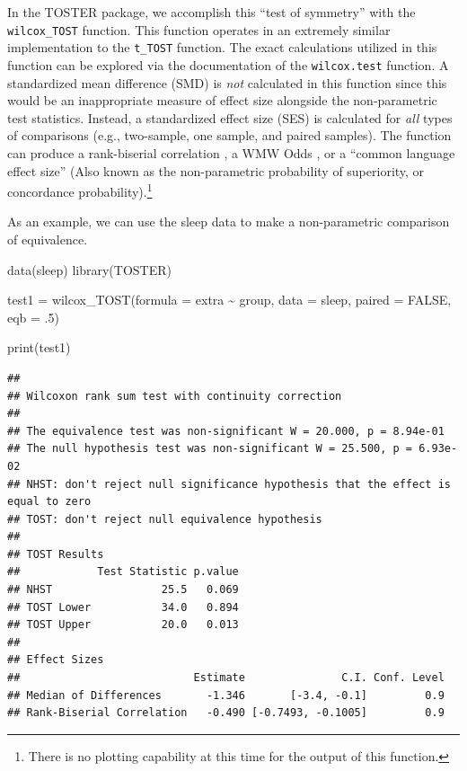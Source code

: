 \documentclass[]{interact}
\theoremstyle{plain}%
\theoremstyle{definition}
\theoremstyle{remark}
\newenvironment{Shaded}{\begin{snugshade}}{\end{snugshade}}
\newcommand{\AttributeTok}[1]{\textcolor[rgb]{0.77,0.63,0.00}{#1}}
\newcommand{\ConstantTok}[1]{\textcolor[rgb]{0.00,0.00,0.00}{#1}}
\newcommand{\DecValTok}[1]{\textcolor[rgb]{0.00,0.00,0.81}{#1}}
\newcommand{\FunctionTok}[1]{\textcolor[rgb]{0.00,0.00,0.00}{#1}}
\newcommand{\NormalTok}[1]{#1}
\newcommand{\OtherTok}[1]{\textcolor[rgb]{0.56,0.35,0.01}{#1}}
\newcommand{\SpecialCharTok}[1]{\textcolor[rgb]{0.00,0.00,0.00}{#1}}
\newcommand{\StringTok}[1]{\textcolor[rgb]{0.31,0.60,0.02}{#1}}
\begin{document}
In the TOSTER package, we accomplish this ``test of symmetry'' with the
\texttt{wilcox\_TOST} function. This function operates in an extremely
similar implementation to the \texttt{t\_TOST} function. The exact
calculations utilized in this function can be explored via the
documentation of the \texttt{wilcox.test} function. A standardized mean
difference (SMD) is \emph{not} calculated in this function since this
would be an inappropriate measure of effect size alongside the
non-parametric test statistics. Instead, a standardized effect size
(SES) is calculated for \emph{all} types of comparisons (e.g.,
two-sample, one sample, and paired samples). The function can produce a
rank-biserial correlation \citep{Kerby_2014}, a WMW Odds
\citep{wmwodds}, or a ``common language effect size'' \citep{Kerby_2014}
(Also known as the non-parametric probability of superiority, or
concordance probability).\footnote{There is no plotting capability at
  this time for the output of this function.}

As an example, we can use the sleep data to make a non-parametric
comparison of equivalence.

\begin{Shaded}
\begin{Highlighting}[]
\FunctionTok{data}\NormalTok{(}\StringTok{\textquotesingle{}sleep\textquotesingle{}}\NormalTok{)}
\FunctionTok{library}\NormalTok{(TOSTER)}

\NormalTok{test1 }\OtherTok{=} \FunctionTok{wilcox\_TOST}\NormalTok{(}\AttributeTok{formula =}\NormalTok{ extra }\SpecialCharTok{\textasciitilde{}}\NormalTok{ group,}
                      \AttributeTok{data =}\NormalTok{ sleep,}
                      \AttributeTok{paired =} \ConstantTok{FALSE}\NormalTok{,}
                      \AttributeTok{eqb =}\NormalTok{ .}\DecValTok{5}\NormalTok{)}


\FunctionTok{print}\NormalTok{(test1)}
\end{Highlighting}
\end{Shaded}

\begin{verbatim}
## 
## Wilcoxon rank sum test with continuity correction
## 
## The equivalence test was non-significant W = 20.000, p = 8.94e-01
## The null hypothesis test was non-significant W = 25.500, p = 6.93e-02
## NHST: don't reject null significance hypothesis that the effect is equal to zero 
## TOST: don't reject null equivalence hypothesis
## 
## TOST Results 
##            Test Statistic p.value
## NHST                 25.5   0.069
## TOST Lower           34.0   0.894
## TOST Upper           20.0   0.013
## 
## Effect Sizes 
##                           Estimate               C.I. Conf. Level
## Median of Differences       -1.346       [-3.4, -0.1]         0.9
## Rank-Biserial Correlation   -0.490 [-0.7493, -0.1005]         0.9
\end{verbatim}
\end{document}
